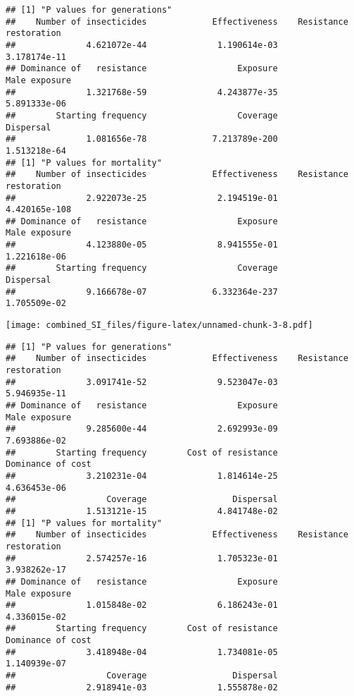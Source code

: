 \documentclass[
]{article}
\begin{document}
\begin{verbatim}
## [1] "P values for generations"
##    Number of insecticides             Effectiveness    Resistance restoration 
##              4.621072e-44              1.190614e-03              3.178174e-11 
## Dominance of   resistance                  Exposure             Male exposure 
##              1.321768e-59              4.243877e-35              5.891333e-06 
##        Starting frequency                  Coverage                 Dispersal 
##              1.081656e-78             7.213789e-200              1.513218e-64 
## [1] "P values for mortality"
##    Number of insecticides             Effectiveness    Resistance restoration 
##              2.922073e-25              2.194519e-01             4.420165e-108 
## Dominance of   resistance                  Exposure             Male exposure 
##              4.123880e-05              8.941555e-01              1.221618e-06 
##        Starting frequency                  Coverage                 Dispersal 
##              9.166678e-07             6.332364e-237              1.705509e-02
\end{verbatim}

\texttt{[image: combined\_SI\_files/figure-latex/unnamed-chunk-3-8.pdf]}

\begin{verbatim}
## [1] "P values for generations"
##    Number of insecticides             Effectiveness    Resistance restoration 
##              3.091741e-52              9.523047e-03              5.946935e-11 
## Dominance of   resistance                  Exposure             Male exposure 
##              9.285600e-44              2.692993e-09              7.693886e-02 
##        Starting frequency        Cost of resistance         Dominance of cost 
##              3.210231e-04              1.814614e-25              4.636453e-06 
##                  Coverage                 Dispersal 
##              1.513121e-15              4.841748e-02 
## [1] "P values for mortality"
##    Number of insecticides             Effectiveness    Resistance restoration 
##              2.574257e-16              1.705323e-01              3.938262e-17 
## Dominance of   resistance                  Exposure             Male exposure 
##              1.015848e-02              6.186243e-01              4.336015e-02 
##        Starting frequency        Cost of resistance         Dominance of cost 
##              3.418948e-04              1.734081e-05              1.140939e-07 
##                  Coverage                 Dispersal 
##              2.918941e-03              1.555878e-02
\end{verbatim}
\end{document}
